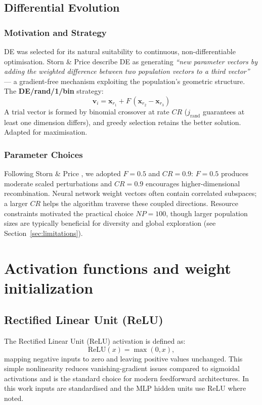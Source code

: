 \documentclass[12pt, a4paper]{article}
\begin{document}
\subsection{Differential Evolution}

\subsubsection{Motivation and Strategy}
DE \cite{storn1997} was selected for its natural suitability to continuous, non-differentiable optimisation. Storn \& Price describe DE as generating \textit{``new parameter vectors by adding the weighted difference between two population vectors to a third vector''} --- a gradient-free mechanism exploiting the population's geometric structure. The \textbf{DE/rand/1/bin} strategy:
\[
\mathbf{v}_i = \mathbf{x}_{r_1} + F\,(\mathbf{x}_{r_2} - \mathbf{x}_{r_3})
\]
A trial vector is formed by binomial crossover at rate $CR$ ($j_\text{rand}$ guarantees at least one dimension differs), and greedy selection retains the better solution. Adapted for maximisation.

\subsubsection{Parameter Choices}
\label{sec:de_params}
Following Storn \& Price \cite{storn1997}, we adopted $F=0.5$ and $CR=0.9$: $F=0.5$ produces moderate scaled perturbations and $CR=0.9$ encourages higher-dimensional recombination. Neural network weight vectors often contain correlated subspaces; a larger $CR$ helps the algorithm traverse these coupled directions. Resource constraints motivated the practical choice $NP=100$, though larger population sizes are typically beneficial for diversity and global exploration (see Section~\ref{sec:limitations}).

\section{Activation functions and weight initialization}

\subsection{Rectified Linear Unit (ReLU)}
The Rectified Linear Unit (ReLU) activation is defined as:
\begin{equation}
\mathrm{ReLU}(x) = \max(0, x),
\end{equation}
mapping negative inputs to zero and leaving positive values unchanged. This simple nonlinearity reduces vanishing-gradient issues compared to sigmoidal activations and is the standard choice for modern feedforward architectures. In this work inputs are standardised and the MLP hidden units use ReLU where noted.
\end{document}
